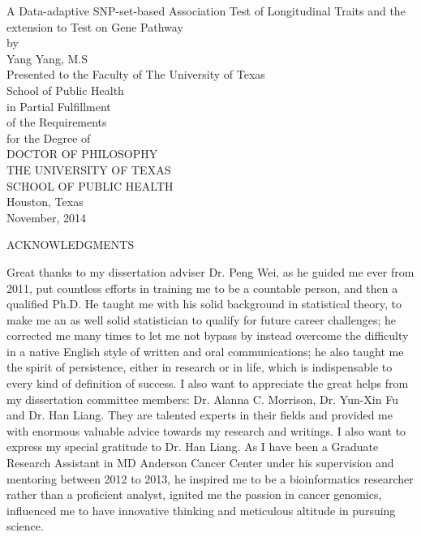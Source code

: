 \documentclass[12pt]{article}
\begin{document}
\newpage
\thispagestyle{empty}
\doublespacing
\begin{center}
{\normalsize A Data-adaptive SNP-set-based Association Test of Longitudinal Traits and the extension to Test on Gene Pathway}\\[3.2cm]

by\\[0.5cm]

Yang Yang, M.S\\[3.2cm]

Presented to the Faculty of The University of Texas\\
School of Public Health\\
in Partial Fulfillment\\
of the Requirements\\
for the Degree of\\[1.5cm]
DOCTOR OF PHILOSOPHY\\[1.5cm]
\singlespacing
THE UNIVERSITY OF TEXAS\\
SCHOOL OF PUBLIC HEALTH\\
Houston, Texas\\
November, 2014
\end{center}


\newpage
\thispagestyle{empty}
\doublespacing
\begin{center}
ACKNOWLEDGMENTS
\end{center}
Great thanks to my dissertation adviser Dr. Peng Wei, as he guided me ever from 2011, put countless efforts in training me to be a countable person, and then a qualified Ph.D. He taught me with his solid background in statistical theory, to make me an as well solid statistician to qualify for future career challenges; he corrected me many times to let me not bypass by instead overcome the difficulty in a native English style of written and oral communications; he also taught me the spirit of persistence, either in research or in life, which is indispensable to every kind of definition of success. I also want to appreciate the great helps from my dissertation committee members: Dr. Alanna C. Morrison, Dr. Yun-Xin Fu and Dr. Han Liang. They are talented experts in their fields and provided me with enormous valuable advice towards my research and writings. I also want to express my special gratitude to Dr. Han Liang. As I have been a Graduate Research Assistant in MD Anderson Cancer Center under his supervision and mentoring between 2012 to 2013, he inspired me to be a bioinformatics researcher rather than a proficient analyst, ignited me the passion in cancer genomics, influenced me to have innovative thinking and meticulous altitude in pursuing science.
\end{document}
